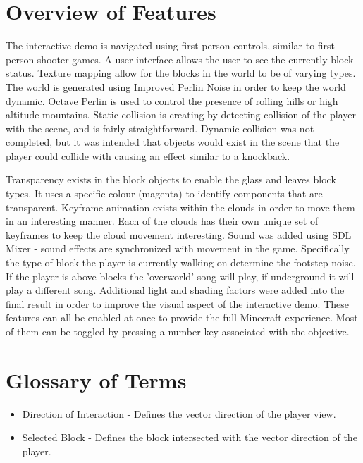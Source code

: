 \documentclass{book}
\begin{document}
\section{Overview of Features}
The interactive demo is navigated using first-person controls, similar to first-person shooter games.
A user interface allows the user to see the currently block status.  Texture mapping allow for the blocks in the world to be of varying types.  The world is generated using Improved Perlin Noise in order to keep the world dynamic.  Octave Perlin is used to control the presence of rolling hills or high altitude mountains.  Static collision is creating by detecting collision of the player with the scene, and is fairly straightforward.  Dynamic collision was not completed, but it was intended that objects would exist in the scene that the player could collide with causing an effect similar to a knockback.  

Transparency exists in the block objects to enable the glass and leaves block types.  It uses a specific colour (magenta) to identify components that are transparent.  Keyframe animation exists within the clouds in order to move them in an interesting manner.  Each of the clouds has their own unique set of keyframes to keep the cloud movement interesting.  Sound was added using SDL Mixer - sound effects are synchronized with movement in the game.  Specifically the type of block the player is currently walking on determine the footstep noise.  If the player is above blocks the 'overworld' song will play, if underground it will play a different song. Additional light and shading factors were added into the final result in order to improve the visual aspect of the interactive demo.  These features can all be enabled at once to provide the full Minecraft experience. Most of them can be toggled by pressing a number key associated with the objective. 

\section{Glossary of Terms}
\begin{itemize}
\item Direction of Interaction - Defines the vector direction of the player view.
\item Selected Block - Defines the block intersected with the vector direction of the player.
\end{itemize}

\end{document}
